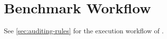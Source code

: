 
\section{Benchmark Workflow}

See \autoref{sec:auditing-rules} for the execution workflow of \ldbcfinbench.

